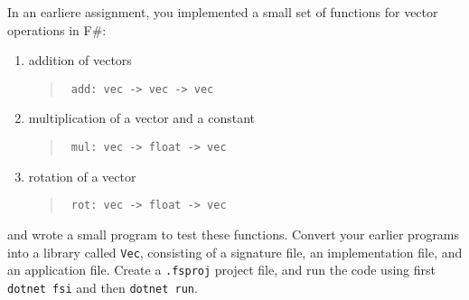 In an earliere assignment, you implemented a small set of functions for vector operations in F\#:
\begin{enumerate}
\item addition of vectors
  \begin{quote}
    \mbox{\lstinline! add: vec -> vec -> vec!}
  \end{quote}
\item multiplication of a vector and a constant
  \begin{quote}
    \mbox{\lstinline! mul: vec -> float -> vec!}
  \end{quote}
\item rotation of a vector
  \begin{quote}
    \mbox{\lstinline! rot: vec -> float -> vec!}
  \end{quote}
\end{enumerate}
and wrote a small program to test these functions. Convert your earlier programs into a library called \lstinline{Vec}, consisting of a signature file, an implementation file, and an application file. Create a
\lstinline[language=console]{.fsproj} project file, and run the code using first \lstinline[language=console]{dotnet fsi} and then  \lstinline[language=console]{dotnet run}. 
